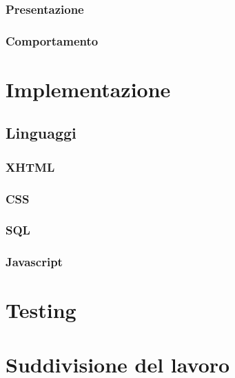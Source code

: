 \documentclass[12pt,a4paper,headings=optiontohead]{scrbook}
\begin{document}
\subsubsection{Presentazione}
\subsubsection{Comportamento}

\section{Implementazione}
\subsection{Linguaggi}
\subsubsection{XHTML}
\subsubsection{CSS}
\subsubsection{SQL}
\subsubsection{Javascript}

\section{Testing}

\section{Suddivisione del lavoro}
\end{document}

